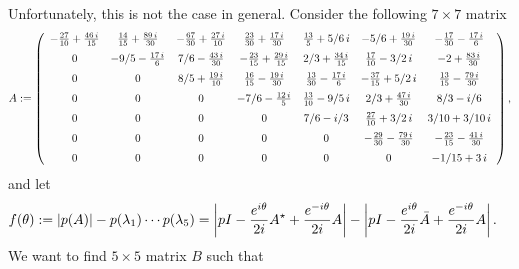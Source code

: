 \documentclass[10pt,a4paper,reqno]{amsart}
\newcommand{\imag}{{\rm i}}
\begin{document}
Unfortunately, this is not the case in general. Consider the following $7\times 7$ matrix
$$
A:= \left( \begin {array}{ccccccc} -{\frac {27}{10}}+{\frac {46\,i}{15}}&
{\frac {14}{15}}+{\frac {89\,i}{30}}&-{\frac {67}{30}}+{\frac {27\,i}{
10}}&{\frac {23}{30}}+{\frac {17\,i}{30}}&{\frac {13}{5}}+5/6\,i&-5/6+
{\frac {19\,i}{30}}&-{\frac {17}{30}}-{\frac {17\,i}{6}}
\\ \noalign{\medskip}0&-9/5-{\frac {17\,i}{6}}&7/6-{\frac {43\,i}{30}}
&-{\frac {23}{15}}+{\frac {29\,i}{15}}&2/3+{\frac {34\,i}{15}}&{\frac 
{17}{10}}-3/2\,i&-2+{\frac {83\,i}{30}}\\ \noalign{\medskip}0&0&8/5+{
\frac {19\,i}{10}}&{\frac {16}{15}}-{\frac {19\,i}{30}}&{\frac {13}{30
}}-{\frac {17\,i}{6}}&-{\frac {37}{15}}+5/2\,i&{\frac {13}{15}}-{
\frac {79\,i}{30}}\\ \noalign{\medskip}0&0&0&-7/6-{\frac {12\,i}{5}}&{
\frac {13}{10}}-9/5\,i&2/3+{\frac {47\,i}{30}}&8/3-i/6
\\ \noalign{\medskip}0&0&0&0&7/6-i/3&{\frac {27}{10}}+3/2\,i&3/10+3/10
\,i\\ \noalign{\medskip}0&0&0&0&0&-{\frac {29}{30}}-{\frac {79\,i}{30}
}&-{\frac {23}{15}}-{\frac {41\,i}{30}}\\ \noalign{\medskip}0&0&0&0&0&0
&-1/15+3\,i\end {array} \right),
$$
and let
\begin{align*}
f(\theta)&:=|p(A)|-p(\lambda_1)\cdots p(\lambda_5)=\left|pI-\frac{e^{\imag \theta}}{2\imag}A^\star+\frac{e^{-\imag \theta}}{2\imag}A\right|-\left|pI-\frac{e^{\imag \theta}}{2\imag}\bar A+\frac{e^{-\imag \theta}}{2\imag}A\right|.
\end{align*}
We want to find $5\times 5$ matrix $B$ such that
\end{document}

